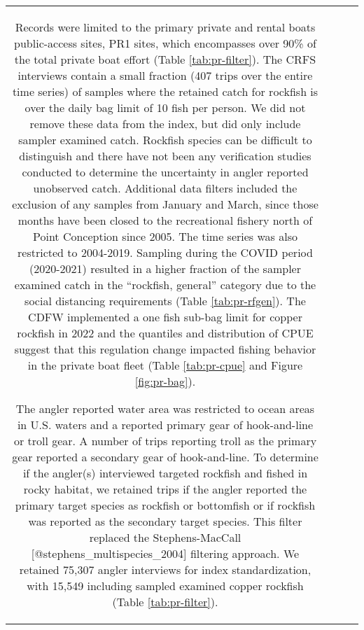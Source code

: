 \documentclass[11pt,
  letterpaper,
]{article}
\begin{document}
\begin{longtable}[t]{c>{\centering\arraybackslash}p{2cm}>{\centering\arraybackslash}p{2cm}>{\centering\arraybackslash}p{2cm}}
Records were limited to the primary private and rental boats public-access sites, PR1 sites, which encompasses over 90\% of the total private boat effort (Table \ref{tab:pr-filter}). The CRFS interviews contain a small fraction (407 trips over the entire time series) of samples where the retained catch for rockfish is over the daily bag limit of 10 fish per person. We did not remove these data from the index, but did only include sampler examined catch. Rockfish species can be difficult to distinguish and there have not been any verification studies conducted to determine the uncertainty in angler reported unobserved catch. Additional data filters included the exclusion of any samples from January and March, since those months have been closed to the recreational fishery north of Point Conception since 2005. The time series was also restricted to 2004-2019. Sampling during the COVID period (2020-2021) resulted in a higher fraction of the sampler examined catch in the ``rockfish, general'' category due to the social distancing requirements (Table \ref{tab:pr-rfgen}). The CDFW implemented a one fish sub-bag limit for copper rockfish in 2022 and the quantiles and distribution of CPUE suggest that this regulation change impacted fishing behavior in the private boat fleet (Table \ref{tab:pr-cpue} and Figure \ref{fig:pr-bag}).

The angler reported water area was restricted to ocean areas in U.S. waters and a reported primary gear of hook-and-line or troll gear. A number of trips reporting troll as the primary gear reported a secondary gear of hook-and-line. To determine if the angler(s) interviewed targeted rockfish and fished in rocky habitat, we retained trips if the angler reported the primary target species as rockfish or bottomfish or if rockfish was reported as the secondary target species. This filter replaced the Stephens-MacCall {[}@stephens\_multispecies\_2004{]} filtering approach. We retained 75,307 angler interviews for index standardization, with 15,549 including sampled examined copper rockfish (Table \ref{tab:pr-filter}).


\end{longtable}
\end{document}
